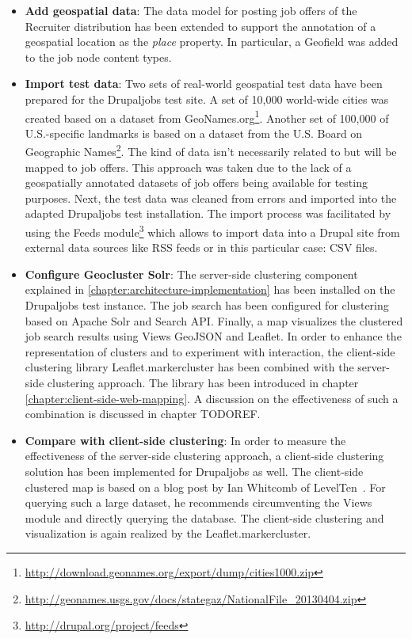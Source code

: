 \begin{itemize}

\item \textbf{Add geospatial data}: The data model for posting job offers of the Recruiter distribution has been extended to support the annotation of a geospatial location as the \textit{place} property. In particular, a Geofield was added to the job node content types.

\item \textbf{Import test data}: Two sets of real-world geospatial test data have been prepared for the Drupaljobs test site. A set of 10,000 world-wide cities was created based on a dataset from GeoNames.org\footnote{\url{http://download.geonames.org/export/dump/cities1000.zip}}. Another set of 100,000 of U.S.-specific landmarks is based on a dataset from the U.S. Board on Geographic Names\footnote{\url{http://geonames.usgs.gov/docs/stategaz/NationalFile_20130404.zip}}. The kind of data isn't necessarily related to but will be mapped to job offers. This approach was taken due to the lack of a geospatially annotated datasets of job offers being available for testing purposes. Next, the test data was cleaned from errors and imported into the adapted Drupaljobs test installation. The import process was facilitated by using the Feeds module\footnote{\url{http://drupal.org/project/feeds}} which allows to import data into a Drupal site from external data sources like RSS feeds or in this particular case: CSV files.

\item \textbf{Configure Geocluster Solr}: The server-side clustering component explained in \ref{chapter:architecture-implementation} has been installed on the Drupaljobs test instance. The job search has been configured for clustering based on Apache Solr and Search API. Finally, a map visualizes the clustered job search results using Views GeoJSON and Leaflet. In order to enhance the representation of clusters and to experiment with interaction, the client-side clustering library Leaflet.markercluster has been combined with the server-side clustering approach. The library has been introduced in chapter \ref{chapter:client-side-web-mapping}. A discussion on the effectiveness of such a combination is discussed in chapter TODOREF.

\item \textbf{Compare with client-side clustering}: In order to measure the effectiveness of the server-side clustering approach, a client-side clustering solution has been implemented for Drupaljobs as well. The client-side clustered map is based on a blog post by Ian Whitcomb of LevelTen~\cite{blog:leaflet-made-to-order}. For querying such a large dataset, he recommends circumventing the Views module and directly querying the database. The client-side clustering and visualization is again realized by the Leaflet.markercluster.

\end{itemize}

